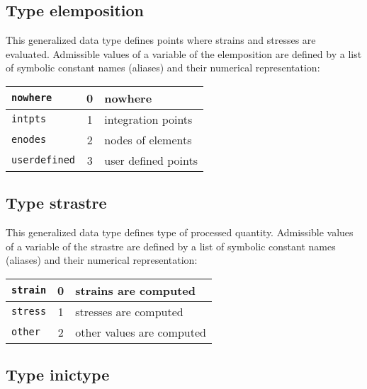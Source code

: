 \subsection{Type {\sf elemposition}}
\label{sectelemposition}

This generalized data type defines points where strains and stresses are evaluated.
Admissible values of a variable of the {\sf elemposition} are defined by a list of symbolic constant names (aliases)
and their numerical representation:

\begin{center}
\begin{tabular}{|l|c|l|}
\hline
{\tt nowhere} & 0 & nowhere
\\ \hline
{\tt intpts} & 1 & integration points
\\ \hline
{\tt enodes} & 2 & nodes of elements
\\ \hline
{\tt userdefined} & 3 & user defined points
\\ \hline
\end{tabular}
\end{center}


\subsection{Type {\sf strastre}}
\label{sectstrastre}

This generalized data type defines type of processed quantity.
Admissible values of a variable of the {\sf strastre} are defined by a list of symbolic constant names (aliases)
and their numerical representation:

\begin{center}
\begin{tabular}{|l|c|l|}
\hline
{\tt strain} & 0 & strains are computed
\\ \hline
{\tt stress} & 1 & stresses are computed
\\ \hline
{\tt other} & 2 & other values are computed
\\ \hline
\end{tabular}
\end{center}


\subsection{Type {\sf inictype}}
\label{sectinictype}

